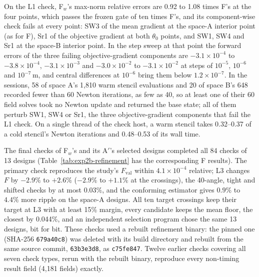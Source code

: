 \documentclass{anvil-paper}
\begin{document}
On the L1 check, F$_w$'s max-norm relative errors are 0.92 to 1.08 times
F's at the four points, which passes the frozen gate of ten times F's, and
its component-wise check fails at every point: SW3 of the mean gradient at
the space-A interior point (as for F), Sr1 of the objective gradient at
both $\theta_0$ points, and SW1, SW4 and Sr1 at the space-B interior point.
In the step sweep at that point the forward errors of the three failing
objective-gradient components are $-3.1\times10^{-4}$ to $-3.8\times10^{-4}$,
$-3.1\times10^{-3}$ and $-3.0\times10^{-2}$ to $-3.1\times10^{-2}$ at steps
of $10^{-5}$, $10^{-6}$ and $10^{-7}$\,m, and central differences at
$10^{-6}$ bring them below $1.2\times10^{-7}$. In the sessions, 58 of
space A's 1,810 warm stencil evaluations and 20 of space B's 648 recorded
fewer than 60 Newton iterations, as few as 40, so at least one of their 60
field solves took no Newton update and returned the base state; all of
them perturb SW1, SW4 or Sr1, the three objective-gradient components that
fail the L1 check. On a single thread of the
check host, a warm stencil takes 0.32--0.37 of a cold stencil's Newton
iterations and 0.48--0.53 of its wall time.

The final checks of F$_w$'s and its A$'$'s selected designs completed all 84
checks of 13 designs (Table~\ref{tab:exp2b-refinement} has the
corresponding F results). The primary check reproduces the study's
$F_{\mathrm{val}}$ within $4.1\times10^{-4}$ relative; L3 changes $F$ by
$-2.9\%$ to $+2.6\%$ ($-2.9\%$ to $+1.1\%$ at the crossings), the 40-angle,
tight and shifted checks by at most $0.03\%$, and the conforming estimator
gives $0.9\%$ to $4.4\%$ more ripple on the space-A designs. All ten target
crossings keep their target at L3 with at least 15\% margin, every
candidate keeps the mean floor, the closest by 0.044\%, and an independent
selection program chose the same 13 designs, bit for bit. These checks used
a rebuilt refinement binary: the pinned one (SHA-256 \texttt{679a40c8}) was
deleted with its build directory and rebuilt from the same source commit,
\texttt{63b3e3d8}, as \texttt{c75fe847}. Twelve earlier checks covering all
seven check types, rerun with the rebuilt binary, reproduce every
non-timing result field (4,181 fields) exactly.

\begin{table}[H]\centering\small
\caption{Warm-stencil arm: charged time units to the first attaining
validation for A$'$ and F$_w$ (repeat~1, F$_w$ session units) and their
ratio per start, with the geometric mean.}
\label{tab:exp2c-ratios}
\end{table}
\end{document}
